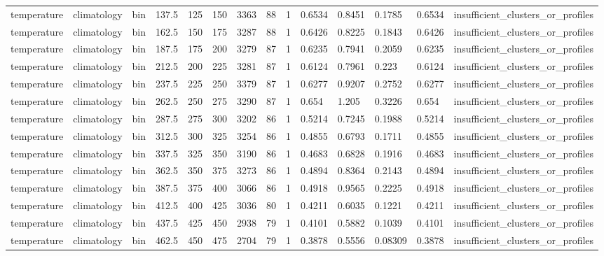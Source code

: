 \begin{table}[htbp]
\begin{tabular}{llllllllllllll}
temperature & climatology & bin & 137.5 & 125 & 150 & 3363 & 88 & 1 & 0.6534 & 0.8451 & 0.1785 & 0.6534 & insufficient\_clusters\_or\_profiles \\
temperature & climatology & bin & 162.5 & 150 & 175 & 3287 & 88 & 1 & 0.6426 & 0.8225 & 0.1843 & 0.6426 & insufficient\_clusters\_or\_profiles \\
temperature & climatology & bin & 187.5 & 175 & 200 & 3279 & 87 & 1 & 0.6235 & 0.7941 & 0.2059 & 0.6235 & insufficient\_clusters\_or\_profiles \\
temperature & climatology & bin & 212.5 & 200 & 225 & 3281 & 87 & 1 & 0.6124 & 0.7961 & 0.223 & 0.6124 & insufficient\_clusters\_or\_profiles \\
temperature & climatology & bin & 237.5 & 225 & 250 & 3379 & 87 & 1 & 0.6277 & 0.9207 & 0.2752 & 0.6277 & insufficient\_clusters\_or\_profiles \\
temperature & climatology & bin & 262.5 & 250 & 275 & 3290 & 87 & 1 & 0.654 & 1.205 & 0.3226 & 0.654 & insufficient\_clusters\_or\_profiles \\
temperature & climatology & bin & 287.5 & 275 & 300 & 3202 & 86 & 1 & 0.5214 & 0.7245 & 0.1988 & 0.5214 & insufficient\_clusters\_or\_profiles \\
temperature & climatology & bin & 312.5 & 300 & 325 & 3254 & 86 & 1 & 0.4855 & 0.6793 & 0.1711 & 0.4855 & insufficient\_clusters\_or\_profiles \\
temperature & climatology & bin & 337.5 & 325 & 350 & 3190 & 86 & 1 & 0.4683 & 0.6828 & 0.1916 & 0.4683 & insufficient\_clusters\_or\_profiles \\
temperature & climatology & bin & 362.5 & 350 & 375 & 3273 & 86 & 1 & 0.4894 & 0.8364 & 0.2143 & 0.4894 & insufficient\_clusters\_or\_profiles \\
temperature & climatology & bin & 387.5 & 375 & 400 & 3066 & 86 & 1 & 0.4918 & 0.9565 & 0.2225 & 0.4918 & insufficient\_clusters\_or\_profiles \\
temperature & climatology & bin & 412.5 & 400 & 425 & 3036 & 80 & 1 & 0.4211 & 0.6035 & 0.1221 & 0.4211 & insufficient\_clusters\_or\_profiles \\
temperature & climatology & bin & 437.5 & 425 & 450 & 2938 & 79 & 1 & 0.4101 & 0.5882 & 0.1039 & 0.4101 & insufficient\_clusters\_or\_profiles \\
temperature & climatology & bin & 462.5 & 450 & 475 & 2704 & 79 & 1 & 0.3878 & 0.5556 & 0.08309 & 0.3878 & insufficient\_clusters\_or\_profiles \\

\end{tabular}
\end{table}
